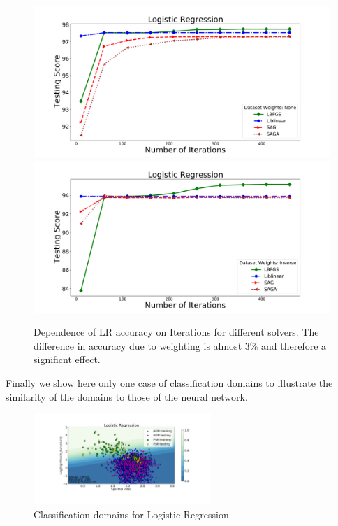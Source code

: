 \begin{figure}[h]
\includegraphics[width=\twopicsp\textwidth]{plots/lr_train.pdf}
\includegraphics[width=\twopicsp\textwidth]{plots/lr_train_weights.pdf}
\caption{Dependence of LR accuracy on Iterations for different solvers. The difference in accuracy due to weighting is almost 3\% and therefore a significnt effect.}
\label{fig:LR_accuracy}
\end{figure}

Finally we show here only one case of classification domains to illustrate the similarity of the domains to those of the neural network. \\

\begin{figure}[h]
\hspace*{-1.5cm}
\includegraphics[width=0.6\textwidth]{plots/classification_domains/lr_200_lbfgs.pdf}
\caption{Classification domains for Logistic Regression}
\label{fig:LR_domains}
\end{figure}


